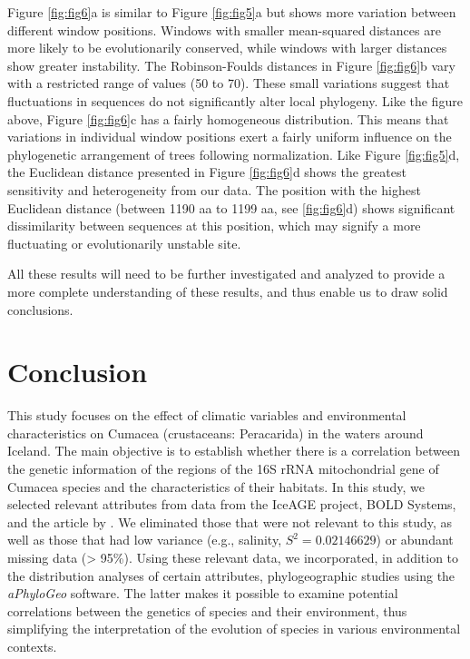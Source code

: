 Figure \ref{fig:fig6}a is similar to Figure \ref{fig:fig5}a but shows more variation between different window positions. Windows with smaller mean-squared distances are more likely to be evolutionarily conserved, while windows with larger distances show greater instability. The Robinson-Foulds distances in Figure \ref{fig:fig6}b vary with a restricted range of values (50 to 70). These small variations suggest that fluctuations in sequences do not significantly alter local phylogeny. Like the figure above, Figure \ref{fig:fig6}c has a fairly homogeneous distribution. This means that variations in individual window positions exert a fairly uniform influence on the phylogenetic arrangement of trees following normalization. Like Figure \ref{fig:fig5}d, the Euclidean distance presented in Figure \ref{fig:fig6}d shows the greatest sensitivity and heterogeneity from our data. The position with the highest Euclidean distance (between 1190 aa to 1199 aa, see \ref{fig:fig6}d) shows significant dissimilarity between sequences at this position, which may signify a more fluctuating or evolutionarily unstable site. 

All these results will need to be further investigated and analyzed to provide a more complete understanding of these results, and thus enable us to draw solid conclusions.

\section{Conclusion}\label{conclusion}

This study focuses on the effect of climatic variables and environmental characteristics on Cumacea (crustaceans: Peracarida) in the waters around Iceland. The main objective is to establish whether there is a correlation between the genetic information of the regions of the 16S rRNA mitochondrial gene of Cumacea species and the characteristics of their habitats. In this study, we selected relevant attributes from data from the IceAGE project, BOLD Systems, and the article by \citep{uhlir_adding_2021}. We eliminated those that were not relevant to this study, as well as those that had low variance (e.g., salinity, $S^2 = 0.02146629$) or abundant missing data (> 95\%). Using these relevant data, we incorporated, in addition to the distribution analyses of certain attributes, phylogeographic studies using the \textit{aPhyloGeo} software. The latter makes it possible to examine potential correlations between the genetics of species and their environment, thus simplifying the interpretation of the evolution of species in various environmental contexts.

